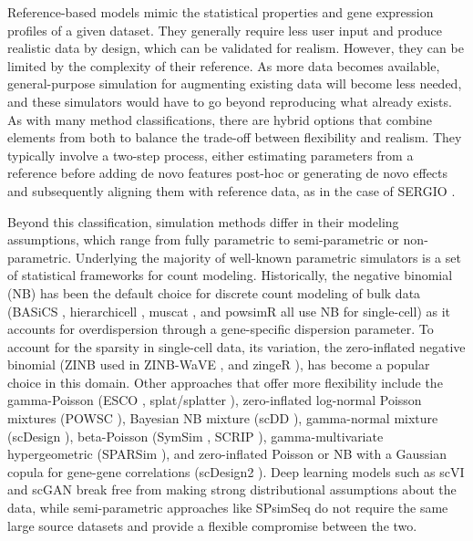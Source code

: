 Reference-based models mimic the statistical properties and gene expression profiles of a given dataset. They generally require less user input and produce realistic data by design, which can be validated for realism. However, they can be limited by the complexity of their reference. As more data becomes available, general-purpose simulation for augmenting existing data will become less needed, and these simulators would have to go beyond reproducing what already exists. As with many method classifications, there are hybrid options that combine elements from both to balance the trade-off between flexibility and realism. They typically involve a two-step process, either estimating parameters from a reference before adding de novo features post-hoc or generating de novo effects and subsequently aligning them with reference data, as in the case of SERGIO \cite{dibaeinia2020sergio}.

Beyond this classification, simulation methods differ in their modeling assumptions, which range from fully parametric to semi-parametric or non-parametric. Underlying the majority of well-known parametric simulators is a set of statistical frameworks for count modeling. Historically, the negative binomial (NB) has been the default choice for discrete count modeling of bulk data (BASiCS \cite{vallejos2015basics}, hierarchicell \cite{zimmerman2021hierarchicell}, muscat \cite{crowell2020muscat}, and powsimR \cite{vieth2017powsimr} all use NB for single-cell) as it accounts for overdispersion through a gene-specific dispersion parameter. To account for the sparsity in single-cell data, its variation, the zero-inflated negative binomial (ZINB used in ZINB-WaVE \cite{risso2018general}, and zingeR \cite{van2017zinger}), has become a popular choice in this domain. Other approaches that offer more flexibility include the gamma-Poisson (ESCO \cite{tian2021esco}, splat/splatter \cite{zappia2017splatter}), zero-inflated log-normal Poisson mixtures (POWSC \cite{su2020simulation}), Bayesian NB mixture (scDD \cite{korthauer2016statistical}), gamma-normal mixture (scDesign \cite{li2019statistical}), beta-Poisson (SymSim \cite{zhang2019simulating}, SCRIP \cite{qin2022scrip}), gamma-multivariate hypergeometric (SPARSim \cite{baruzzo2020sparsim}), and zero-inflated Poisson or NB with a Gaussian copula for gene-gene correlations (scDesign2 \cite{sun2021scdesign2}). Deep learning models such as scVI \cite{lopez2018deep} and scGAN \cite{marouf2020realistic} break free from making strong distributional assumptions about the data, while semi-parametric approaches like SPsimSeq \cite{assefa2020spsimseq} do not require the same large source datasets and provide a flexible compromise between the two.


